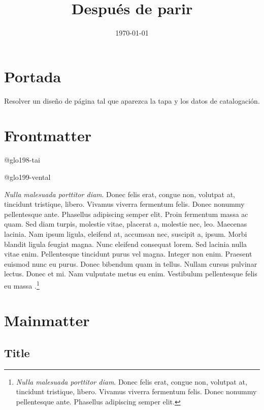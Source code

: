 \documentclass{book}
\title{Después de parir}
\date{\today}
\begin{document}
\frontmatter


\maketitle

\tableofcontents

\chapter{Portada}

Resolver un diseño de página tal que aparezca la tapa y los datos de catalogación.

\chapter{Frontmatter}

\lipsum[1]

\gls{@glo198-tai}

\gls{@glo199-vental}

\emph{Nulla malesuada porttitor diam}. Donec felis erat, congue non, volutpat at, tincidunt tristique, libero. Vivamus viverra fermentum felis. Donec nonummy pellentesque ante. Phasellus adipiscing semper elit. Proin fermentum massa ac quam. Sed diam turpis, molestie vitae, placerat a, molestie nec, leo. Maecenas lacinia. Nam ipsum ligula, eleifend at, accumsan nec, suscipit a, ipsum. Morbi blandit ligula feugiat magna. Nunc eleifend consequat lorem. Sed lacinia nulla vitae enim. Pellentesque tincidunt purus vel magna. Integer non enim. Praesent euismod nunc eu purus. Donec bibendum quam in tellus. Nullam cursus pulvinar lectus. Donec et mi. Nam vulputate metus eu enim. Vestibulum pellentesque felis eu massa \parencite{@940-SHUMWAY1999}.\footnote{\emph{Nulla malesuada porttitor diam}. Donec felis erat, congue non, volutpat at, tincidunt tristique, libero. Vivamus viverra fermentum felis. Donec nonummy pellentesque ante. Phasellus adipiscing semper elit.}

\lipsum[1]

\mainmatter

\chapter{Mainmatter}
\label{mychapter}

\lipsum[1]

\section{Title}
\end{document}
